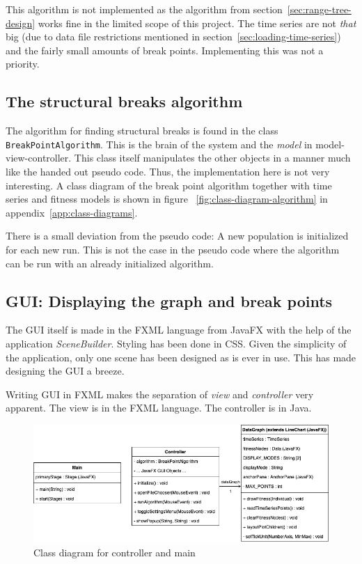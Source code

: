 This algorithm is not implemented as the algorithm from
section~\ref{sec:range-tree-design} works fine in the limited scope of this
project. The time series are not \textit{that} big (due to data file restrictions
mentioned in section~\ref{sec:loading-time-series}) and the fairly small amounts
of break points. Implementing this was not a priority. 



\subsection{The structural breaks algorithm}

The algorithm for finding structural breaks is found in the class
\texttt{BreakPointAlgorithm}. This is the brain of the system and the
\textit{model} in model-view-controller. This class itself manipulates the other
objects in a manner much like the handed out pseudo code. Thus, the
implementation here is not very interesting. A class diagram of the break point
algorithm together with time series and fitness models is shown in figure
~\ref{fig:class-diagram-algorithm} in appendix~\ref{app:class-diagrams}.

There is a small deviation from the pseudo code: A new population is initialized
for each new run. This is not the case in the pseudo code where the algorithm
can be run with an already initialized algorithm. 


\subsection{GUI: Displaying the graph and break points}
\label{sec:graph-implementation}

The GUI itself is made in the FXML language from JavaFX with the help of the
application \textit{SceneBuilder}. Styling has been done in CSS. Given the simplicity of the application, only one
scene has been designed as is ever in use. This has made 
designing the GUI a breeze. 

Writing GUI in FXML makes the separation of \textit{view} and
\textit{controller} very apparent. The view is in the FXML language. The
controller is in Java. 

\begin{figure}[ht]
    \centering
    \includegraphics[width=.8\textwidth]{fig/class-diagram-controller.png}
    \caption{Class diagram for controller and main}
    \label{fig:class-diagram-controller}
\end{figure}

